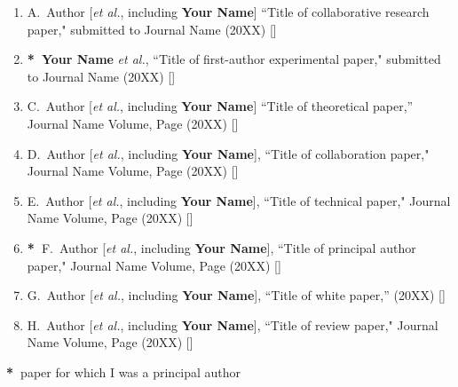 \begin{enumerate}
\item A.~Author [\textit{et al.}, including {\bf Your Name}] ``Title of collaborative research paper," submitted to Journal Name (20XX) []
\item \textbf{*~}\textbf{Your Name} \textit{et al.}, ``Title of first-author experimental paper," submitted to Journal Name (20XX) []
\item C.~Author [\textit{et al.}, including {\bf Your Name}] ``Title of theoretical paper,'' Journal Name Volume, Page (20XX) []
\item D.~Author [\textit{et al.}, including {\bf Your Name}], ``Title of collaboration paper," Journal Name Volume, Page (20XX) []
\item E.~Author [\textit{et al.}, including {\bf Your Name}], ``Title of technical paper," Journal Name Volume, Page (20XX) []
\item \textbf{*~}F.~Author [\textit{et al.}, including {\bf Your Name}], ``Title of principal author paper," Journal Name Volume, Page (20XX) []
\item G.~Author [\textit{et al.}, including {\bf Your Name}], ``Title of white paper,'' (20XX) []
\item H.~Author [\textit{et al.}, including {\bf Your Name}], ``Title of review paper," Journal Name Volume, Page (20XX) []
\end{enumerate}
\textbf{*~}paper for which I was a principal author